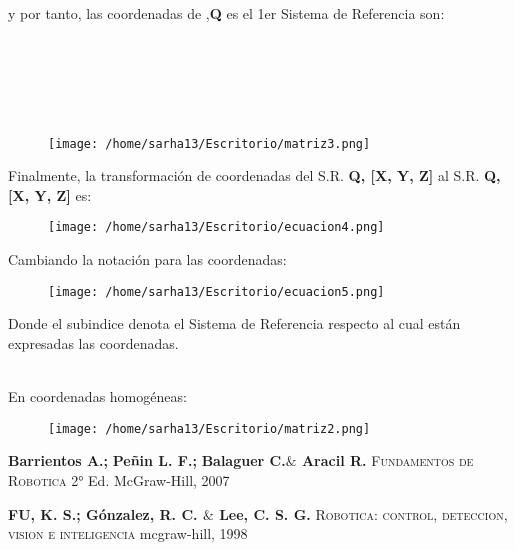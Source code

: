 \documentclass[letter,openright,12pt,spanish]{report}
\begin{document}
y por tanto, las coordenadas de ,\textbf{Q} es el 1er Sistema de Referencia son:\\\\\\\\\\\\

\begin{figure}[htp]
\centering
\texttt{[image: /home/sarha13/Escritorio/matriz3.png]}
\caption{}
\label{}
\end{figure}


Finalmente, la transformaci\'on de coordenadas del S.R. \textbf{Q, [X, Y, Z]} al S.R. \textbf{Q, [X, Y, Z]} es:\\

\begin{figure}[htp]
\centering
\texttt{[image: /home/sarha13/Escritorio/ecuacion4.png]}
\caption{}
\label{}
\end{figure}

Cambiando la notaci\'on para las coordenadas:\\

\begin{figure}[htp]
\centering
\texttt{[image: /home/sarha13/Escritorio/ecuacion5.png]}
\caption{}
\label{}
\end{figure}

Donde el subindice denota el Sistema de Referencia respecto al cual est\'an expresadas las coordenadas.\\\\

\newpage

En coordenadas homog\'eneas:

\begin{figure}[htp]
\centering
\texttt{[image: /home/sarha13/Escritorio/matriz2.png]}
\caption{}
\label{}
\end{figure}
\newpage

\begin{thebibliography}{X}
 \textbf{Barrientos A.;}  \textbf{Peñin L. F.;} \textbf{Balaguer C.$\&$ Aracil R.} \textsc{Fundamentos de Robotica} 2° Ed. McGraw-Hill, 2007

 \textbf{FU, K. S.; G\'onzalez, R. C. $\&$ Lee, C. S. G.} \textsc{Robotica: control, deteccion, vision e inteligencia} mcgraw-hill, 1998
\end{thebibliography}
\end{document}
